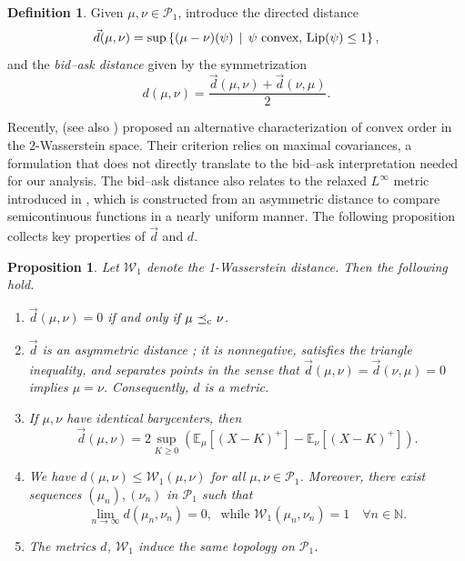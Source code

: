 \documentclass[11pt]{article}
\newcommand{\cP}{\mathcal{P}}
\newcommand{\cW}{\mathcal{W}}
\newcommand{\N}{\mathbb{N}} %
\theoremstyle{plain}
\newtheorem{proposition}[theorem]{Proposition}
\theoremstyle{definition}
\newtheorem{definition}[theorem]{Definition}
\theoremstyle{remark}
\newcommand{\E}{\mathbb{E}}
\DeclareMathOperator{\cleq}{\,\preceq_{\rm c}\,}
\theoremstyle{plain}
\begin{document}
\begin{definition}\label{def:bidaskdist}
Given $\mu,\nu \in \cP_1$, introduce the directed distance   
\begin{equation*}\label{eq:directedDist}
    \vec{d}(\mu,\nu) = \sup \left\{(\mu-\nu)(\psi) \,\mid \, \psi \text{ convex, } \textnormal{Lip}(\psi) \le 1 \right\},
\end{equation*}
and the \emph{bid--ask distance} given by the symmetrization   
\begin{equation*}
    d(\mu,\nu) = \frac{\vec{d}(\mu,\nu) + \vec{d}(\nu,\mu)}{2}.
\end{equation*}
\end{definition}
Recently, \cite{WieselZhang2023} (see also \cite{acciaio}) proposed an alternative characterization of  convex order in the $2$-Wasserstein space. Their criterion relies on maximal covariances, a formulation that does not directly translate to the bid--ask interpretation needed for our analysis.   The bid--ask distance also relates to the relaxed $L^\infty$ metric introduced in \cite{SonerTissot}, which is constructed from an asymmetric distance to compare semicontinuous functions in a nearly uniform manner. The following proposition collects key properties of $\vec{d}$ and $d$. 
\begin{proposition}\label{prop:bidAskDistance}
Let $\cW_1$ denote the 1-Wasserstein distance. Then the following hold. 
    \begin{enumerate}[label = (\roman*)]


        \item  $ \vec{d}(\mu,\nu) = 0$ if and only if $\mu \cleq \nu$.

              \item $\vec{d}$ is an asymmetric distance \cite{mennucci}; it is nonnegative, satisfies the triangle inequality, and separates points in the sense that $\vec{d}(\mu,\nu) = \vec{d}(\nu,\mu) = 0 $ implies $\mu = \nu$.  
      Consequently, $d$ is a metric.

\item  If $\mu,\nu$ have identical barycenters, then 
$$ \vec{d}(\mu,\nu) = 2\sup_{K\geq 0} \left(\E_{\mu}[(X-K)^+]-\E_{\nu}[(X-K)^+]\right).$$

        \item We have $d(\mu,\nu) \le \cW_1(\mu,\nu)$ for all  $\mu,\nu \in \cP_1$. Moreover, there exist sequences  $(\mu_n),(\nu_n)$ in $\cP_1$ such that 
        $$\lim_{n\to \infty} d(\mu_n,\nu_n) = 0, \;  \text{ while } \cW_1(\mu_n,\nu_n) = 1 \quad \forall n \in \N.$$ 

        \item The metrics $d$, $\cW_1$ induce the same topology on $\cP_1$.


    \end{enumerate}
\end{proposition}
\end{document}
